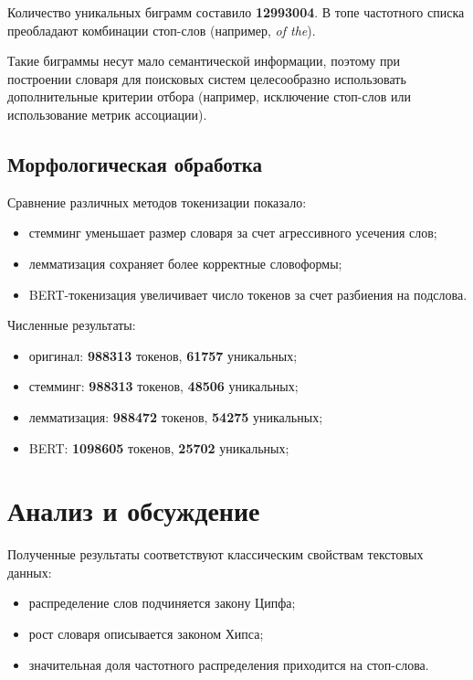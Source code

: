 \documentclass[11pt]{article}
\begin{document}
Количество уникальных биграмм составило \textbf{12993004}. В топе частотного списка
преобладают комбинации стоп-слов (например, \textit{of the}).

Такие биграммы несут мало семантической информации, поэтому при построении словаря
для поисковых систем целесообразно использовать дополнительные критерии отбора
(например, исключение стоп-слов или использование метрик ассоциации).

\subsection{Морфологическая обработка}

Сравнение различных методов токенизации показало:

\begin{itemize}
    \item стемминг уменьшает размер словаря за счет агрессивного усечения слов;
    \item лемматизация сохраняет более корректные словоформы;
    \item BERT-токенизация увеличивает число токенов за счет разбиения на подслова.
\end{itemize}

Численные результаты:

\begin{itemize}
    \item оригинал: \textbf{988313} токенов, \textbf{61757} уникальных;
    \item стемминг: \textbf{988313} токенов, \textbf{48506} уникальных;
    \item лемматизация: \textbf{988472} токенов, \textbf{54275} уникальных;
    \item BERT: \textbf{1098605} токенов, \textbf{25702} уникальных;
\end{itemize}

\section{Анализ и обсуждение}

Полученные результаты соответствуют классическим свойствам текстовых данных:

\begin{itemize}
    \item распределение слов подчиняется закону Ципфа;
    \item рост словаря описывается законом Хипса;
    \item значительная доля частотного распределения приходится на стоп-слова.
\end{itemize}
\end{document}
